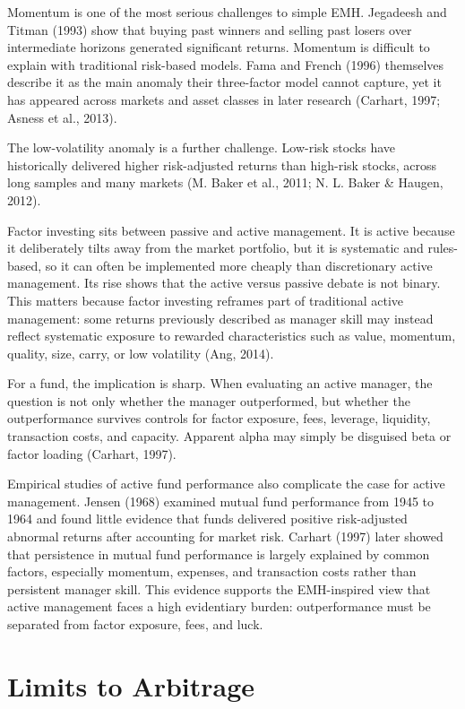 \documentclass[11pt,a4paper]{article}
\begin{document}
Momentum is one of the most serious challenges to simple EMH. Jegadeesh and Titman (1993) show that buying past winners and selling past losers over intermediate horizons generated significant returns. Momentum is difficult to explain with traditional risk-based models. Fama and French (1996) themselves describe it as the main anomaly their three-factor model cannot capture, yet it has appeared across markets and asset classes in later research (Carhart, 1997; Asness et al., 2013).

The low-volatility anomaly is a further challenge. Low-risk stocks have historically delivered higher risk-adjusted returns than high-risk stocks, across long samples and many markets (M. Baker et al., 2011; N. L. Baker \& Haugen, 2012).

Factor investing sits between passive and active management. It is active because it deliberately tilts away from the market portfolio, but it is systematic and rules-based, so it can often be implemented more cheaply than discretionary active management. Its rise shows that the active versus passive debate is not binary. This matters because factor investing reframes part of traditional active management: some returns previously described as manager skill may instead reflect systematic exposure to rewarded characteristics such as value, momentum, quality, size, carry, or low volatility (Ang, 2014).

For a fund, the implication is sharp. When evaluating an active manager, the question is not only whether the manager outperformed, but whether the outperformance survives controls for factor exposure, fees, leverage, liquidity, transaction costs, and capacity. Apparent alpha may simply be disguised beta or factor loading (Carhart, 1997).

Empirical studies of active fund performance also complicate the case for active management. Jensen (1968) examined mutual fund performance from 1945 to 1964 and found little evidence that funds delivered positive risk-adjusted abnormal returns after accounting for market risk. Carhart (1997) later showed that persistence in mutual fund performance is largely explained by common factors, especially momentum, expenses, and transaction costs rather than persistent manager skill. This evidence supports the EMH-inspired view that active management faces a high evidentiary burden: outperformance must be separated from factor exposure, fees, and luck.

\section{Limits to Arbitrage}
\end{document}
